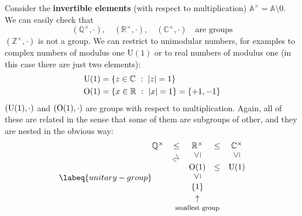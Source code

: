 \documentclass[../main.tex]{subfiles}
\begin{document}
\begin{example}
Consider the \textbf{invertible elements} (with respect to multiplication) $\mathbb{A}^\times=\mathbb{A}\setminus\qty{0}$.\\ %
We can easily check that
\[
(\mathbb{Q}^\times, \cdot), \quad (\mathbb{R}^\times, \cdot), \quad (\mathbb{C}^\times, \cdot) \quad \textrm{are groups}
\]
{\selectfont{}\relax} $(\mathbb{Z}^\times, \cdot)$ is not a group. We can restrict to unimodular numbers, for examples to complex numbers of modulus one U$(1)$ or to real numbers of modulus one (in this case there are just two elements):
\[
\begin{split}
\textrm{U}(1)&=\Bqty{z\in \mathbb{C}\  : \ \abs{z}=1}\\
\textrm{O}(1)&=\qty{x \in \mathbb{R}\  : \ \abs{x}=1}=\qty{+1,-1}
\end{split}
\]
$\qty(\textrm{U}(1),\cdot)$ and $\qty(\textrm{O}(1),\cdot)$ are groups with respect to multiplication. Again, all of these are related in the sense that some of them are subgroups of other, and they are nested in the obvious way:
\begin{equation}\labeq{unitary-group}
\begin{matrix}
\mathbb{Q}^\times &\leq & \mathbb{R}^\times &\leq &\mathbb{C}^\times\\
& {\rotatebox{-35}{$\geq$}} & {\rotatebox{90}{$\leq$}} & & {\rotatebox{90}{$\leq$}}\\
& & \textrm{O}(1) & \leq & \textrm{U}(1)\\
& & {\rotatebox{90}{$\leq$}}\\
& & \underset{\mathclap{\tikz \node {$\uparrow$} node [below=1ex]{\footnotesize smallest group };}}{\qty{1}}
\end{matrix}
\end{equation}
\end{example}
\end{document}
